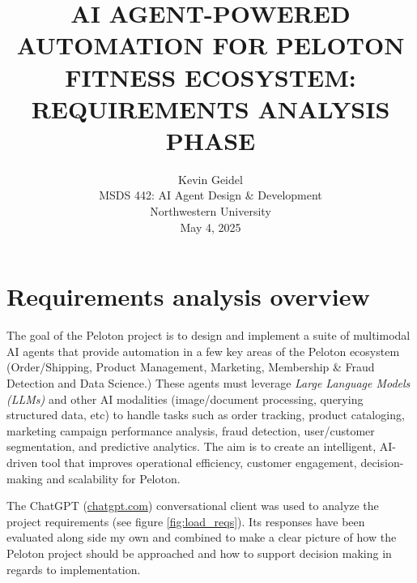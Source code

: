 \documentclass[11pt,letterpaper]{article}
\begin{document}
\selectfont
{}
\doublespacing
\setlength{\droptitle}{1in} 

\title{\large{AI AGENT-POWERED AUTOMATION FOR PELOTON FITNESS ECOSYSTEM: \\ REQUIREMENTS ANALYSIS PHASE \\\vspace{1.2in}}}

\author{
Kevin Geidel \\
MSDS 442: AI Agent Design \& Development \\
Northwestern University \\
May 4, 2025 \\
}

\date{}
\maketitle
\thispagestyle{empty}	
\clearpage
\setcounter{page}{1}

\section*{Requirements analysis overview}
\tab The goal of the Peloton project is to design and implement a suite of multimodal AI agents that provide automation in a few key areas of the Peloton ecosystem (Order/Shipping, Product Management, Marketing, Membership \& Fraud Detection and Data Science.)
These agents must leverage \textit{Large Language Models (LLMs)} and other AI modalities (image/document processing, querying structured data, etc) to handle tasks such as order tracking, product cataloging, marketing campaign performance analysis, fraud detection, user/customer segmentation, and predictive analytics. 
The aim is to create an intelligent, AI-driven tool that improves operational efficiency, customer engagement, decision-making and scalability for Peloton.

The ChatGPT (\url{chatgpt.com}) conversational client was used to analyze the project requirements (see figure \ref{fig:load_reqs}). 
Its responses have been evaluated along side my own and combined to make a clear picture of how the Peloton project should be approached and how to support decision making in regards to implementation.
\end{document}
